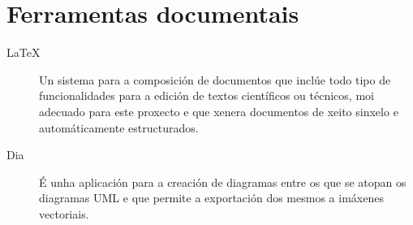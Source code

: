   \section{Ferramentas documentais}

  \begin{description}
   \item [LaTeX]\cite{web:latex} Un sistema para a 
composición de documentos que inclúe todo tipo de funcionalidades para a edición 
de textos científicos ou técnicos, moi adecuado para este proxecto e que xenera 
documentos de xeito sinxelo e automáticamente estructurados.
   \item [Dia]\cite{web:dia} É unha aplicación para a 
creación de diagramas entre os que se atopan os diagramas UML e que permite a 
exportación dos mesmos a imáxenes vectoriais.
  \end{description}
